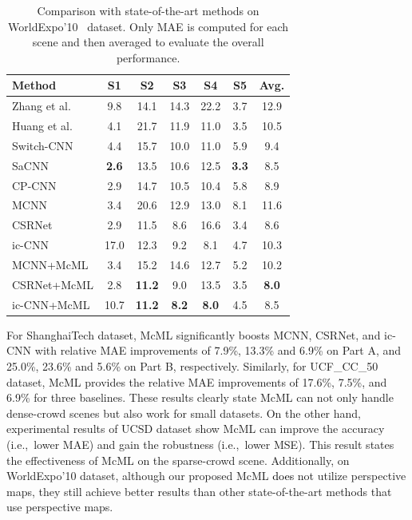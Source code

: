 \documentclass[sigconf]{acmart}
\newcommand{\czq}[1]{\textcolor{black}{#1}}
\begin{document}
\begin{table}
\small
\caption{\small Comparison with state-of-the-art methods on WorldExpo'10~\cite{r-count-privacy-preserving-08} dataset. Only MAE is computed for each scene and then averaged to evaluate the overall performance.}
\vspace{-2mm}
\renewcommand\arraystretch{0.95}
\setlength\tabcolsep{5pt}
\begin{center}
\begin{tabular}{|l|c|c|c|c|c|c|}
\hline
\textbf{Method}        & \textbf{S1} & \textbf{S2} & \textbf{S3} & \textbf{S4} & \textbf{S5} & \textbf{Avg.} \\ \hline
Zhang et al.~\cite{deep-crowd-scene-15}  & 9.8    & 14.1   & 14.3   & 22.2   & 3.7    & 12.9     \\
Huang et al.~\cite{deep-body-BSAD-18}  & 4.1    & 21.7   & 11.9   & 11.0   & 3.5    & 10.5     \\
Switch-CNN~\cite{deep-switch-17}    & 4.4    & 15.7   & 10.0   & 11.0   & 5.9    & 9.4      \\
SaCNN~\cite{deep-fscale-multitask-SaCNN-18}    & \textbf{2.6} & 13.5    & 10.6   & 12.5  & \textbf{3.3}  & 8.5          \\
CP-CNN~\cite{deep-multi-pyramid-cnn-17}        & 2.9    & 14.7   & 10.5   & {10.4}   & 5.8    & 8.9      \\ \hline
MCNN~\cite{MCNN-16}          & 3.4    & 20.6   & 12.9   & 13.0   & 8.1    & 11.6     \\ 
CSRNet~\cite{CSRNet-18}        & 2.9    & {11.5}   & 8.6    & 16.6   & 3.4    & 8.6      \\ 
ic-CNN~\cite{deep-training-ICCNN-18} & 17.0 & 12.3 & 9.2  & 8.1  & 4.7 & 10.3  \\ \hline
MCNN+McML   & 3.4  & 15.2 & 14.6 & 12.7 & 5.2 & 10.2  \\
CSRNet+McML  & 2.8  & \textbf{11.2} & 9.0   & 13.5   & 3.5  & \textbf{8.0}  \\
ic-CNN+McML  & 10.7   & \textbf{11.2} & \textbf{8.2} & \textbf{8.0} & 4.5    & 8.5    \\ \hline
\end{tabular}
\end{center}
\vspace{-2mm}
\label{tab:sota-2}
\end{table}


For ShanghaiTech dataset, McML significantly boosts MCNN, CSRNet, and ic-CNN with relative MAE improvements of 7.9\%, 13.3\% and 6.9\% on Part A, and 25.0\%, 23.6\% and 5.6\% on Part B, respectively.
Similarly, for UCF\_CC\_50 dataset, McML provides the relative MAE improvements of 17.6\%, 7.5\%, and 6.9\% for three baselines.
These results clearly state McML can not only handle dense-crowd scenes but also work for small datasets.
On the other hand, experimental results of UCSD dataset show McML can improve the accuracy (i.e.,~lower MAE) and gain the robustness (i.e.,~lower MSE).
This result states the effectiveness of McML on the sparse-crowd scene.
Additionally, on WorldExpo'10 dataset, although our proposed McML \czq{does} not utilize perspective maps, they still achieve better results than other state-of-the-art methods that use perspective maps.
\end{document}
